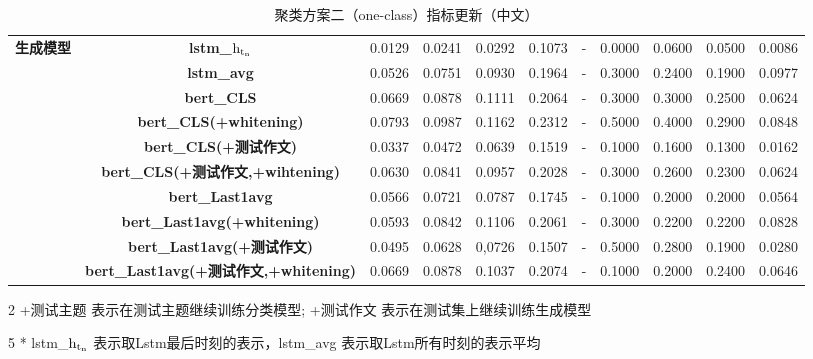 \documentclass[11pt]{article}
\begin{document}
\begin{CJK}{UTF8}{gkai}
\begin{table}[htbp]
{\begin{tabular}{c|c|ccccccccc}
      \hline
      \multirow{10}[0]{*}{\textbf{生成模型}} & \textbf{lstm\_$\rm h_{t_n}$} & 0.0129  & 0.0241  & 0.0292  & 0.1073  & -     & 0.0000  & 0.0600  & 0.0500  & 0.0086  \\
      & \textbf{lstm\_avg} & 0.0526  & 0.0751  & 0.0930  & 0.1964  & -     & 0.3000  & 0.2400  & 0.1900  & 0.0977  \\
      \cline{2-11}
      & \textbf{bert\_CLS} & 0.0669  & 0.0878  & 0.1111  & 0.2064  & -     & 0.3000  & 0.3000  & 0.2500  & 0.0624  \\
      & \textbf{bert\_CLS(+whitening)} & 0.0793  & 0.0987  & 0.1162  & 0.2312  & -     & 0.5000  & 0.4000  & 0.2900  & 0.0848  \\
      & \textbf{bert\_CLS(+测试作文)} & 0.0337  & 0.0472  & 0.0639  & 0.1519  & -     & 0.1000  & 0.1600  & 0.1300  & 0.0162  \\
      & \textbf{bert\_CLS(+测试作文,+wihtening)} & 0.0630  & 0.0841  & 0.0957  & 0.2028  & -     & 0.3000  & 0.2600  & 0.2300  & 0.0624  \\
      \cline{2-11}
      & \textbf{bert\_Last1avg} & 0.0566  & 0.0721  & 0.0787  & 0.1745  & -     & 0.1000  & 0.2000  & 0.2000  & 0.0564  \\
      & \textbf{bert\_Last1avg(+whitening)} & 0.0593  & 0.0842  & 0.1106  & 0.2061  & -     & 0.3000  & 0.2200  & 0.2200  & 0.0828  \\
      & \textbf{bert\_Last1avg(+测试作文)} & 0.0495  & 0.0628  & 0,0726 & 0.1507  & -     & 0.5000  & 0.2800  & 0.1900  & 0.0280  \\
      & \textbf{bert\_Last1avg(+测试作文,+whitening)} & 0.0669  & 0.0878  & 0.1037  & 0.2074  & -     & 0.1000  & 0.2000  & 0.2400  & 0.0646  \\
      \hline
    \end{tabular}}%
    \begin{tablenotes}    %
      \footnotesize               %
      \item[2] +测试主题 表示在测试主题继续训练分类模型; +测试作文 表示在测试集上继续训练生成模型
      \item[5] * lstm\_$\rm h_{t_n}$ 表示取Lstm最后时刻的表示，lstm\_avg 表示取Lstm所有时刻的表示平均 
    \end{tablenotes} 
    \caption{聚类方案二（one-class）指标更新（中文）}
  \label{tab:addlabel}%
\end{table}%


\end{CJK}
\end{document}
